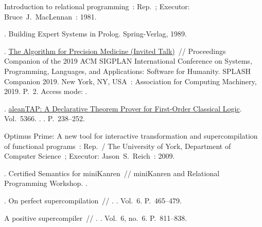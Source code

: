 \begin{thebibliography}{10}
  Introduction to relational programming~: Rep.~; Executor: Bruce~J.~MacLennan~:
    1981.

  . Building Expert Systems in Prolog. \BibDash
  \newblock Spring-Verlag, 1989.

  . \href{http://dx.doi.org/10.1145/3359061.3365208}{The
    Algorithm for Precision Medicine (Invited Talk)}~// Proceedings Companion of
    the 2019 ACM SIGPLAN International Conference on Systems, Programming,
    Languages, and Applications: Software for Humanity. \BibDash
  \newblock SPLASH Companion 2019. \BibDash
  \newblock New York, NY, USA~: Association for Computing Machinery, 2019.
    \BibDash
  \newblock P.~2. \BibDash
  \newblock Access mode: .

  .
    \href{http://dx.doi.org/10.1007/978-3-540-89982-2_26}{aleanTAP: A Declarative
    Theorem Prover for First-Order Classical Logic}. \BibDash
  \newblock Vol.~5366. \BibDash
  . . \BibDash
  \newblock P.~238--252.

  Optimus Prime: A new tool for interactive transformation and supercompilation
    of functional programs~: Rep.~/ The University of York, Department of
    Computer Science~; Executor: Jason~S.~Reich~: 2009.

  . Certified Semantics for
    miniKanren~// miniKanren and Relational Programming Workshop. \BibDash
  .

  . On perfect
    supercompilation~// . \BibDash
  . \BibDash
  \newblock Vol.~6. \BibDash
  \newblock P.~465--479.

   A positive
    supercompiler~// . \BibDash
  . \BibDash
  \newblock Vol.~6, no.~6. \BibDash
  \newblock P.~811--838.


\end{thebibliography}
